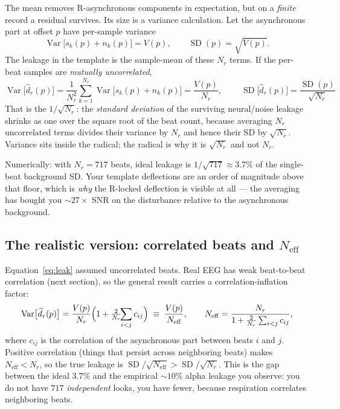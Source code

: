 \documentclass[11pt]{article}
\newcommand{\Var}{\operatorname{Var}}
\newcommand{\SD}{\operatorname{SD}}
\newcommand{\dhat}{\widehat{d}}
\begin{document}
The mean removes R-asynchronous components in expectation, but on a \emph{finite} record a residual
survives. Its size is a variance calculation. Let the asynchronous part at offset $p$ have
per-sample variance
\begin{equation}
\Var\bigl[s_k(p)+n_k(p)\bigr] = V(p), \qquad \SD(p)=\sqrt{V(p)}.
\end{equation}
The leakage in the template is the sample-mean of these $N_r$ terms. If the per-beat samples are
\emph{mutually uncorrelated},
\begin{equation}
\Var\bigl[\dhat_r(p)\bigr]
= \frac{1}{N_r^2}\sum_{k=1}^{N_r}\Var\bigl[s_k(p)+n_k(p)\bigr]
= \frac{V(p)}{N_r},
\qquad
\boxed{\ \SD\bigl[\dhat_r(p)\bigr] = \frac{\SD(p)}{\sqrt{N_r}}\ }
\label{eq:leak}
\end{equation}
That is the $1/\sqrt{N_r}$: the \emph{standard deviation} of the surviving neural/noise leakage
shrinks as one over the square root of the beat count, because averaging $N_r$ uncorrelated terms
divides their variance by $N_r$ and hence their SD by $\sqrt{N_r}$. Variance sits inside the
radical; the radical is why it is $\sqrt{N_r}$ and not $N_r$.

Numerically: with $N_r=717$ beats, ideal leakage is $1/\sqrt{717}\approx 3.7\%$ of the
single-beat background SD. Your template deflections are an order of magnitude above that floor,
which is \emph{why} the R-locked deflection is visible at all --- the averaging has bought you
$\sim\!27\times$ SNR on the disturbance relative to the asynchronous background.

\subsection*{The realistic version: correlated beats and $N_{\mathrm{eff}}$}

Equation~\eqref{eq:leak} assumed uncorrelated beats. Real EEG has weak beat-to-beat correlation
(next section), so the general result carries a correlation-inflation factor:
\begin{equation}
\Var\bigl[\dhat_r(p)\bigr]
= \frac{V(p)}{N_r}\Bigl(1 + \tfrac{2}{N_r}\!\!\sum_{i<j} c_{ij}\Bigr)
\;\equiv\; \frac{V(p)}{N_{\mathrm{eff}}},
\qquad
N_{\mathrm{eff}} = \frac{N_r}{1 + \tfrac{2}{N_r}\sum_{i<j}c_{ij}},
\label{eq:neff}
\end{equation}
where $c_{ij}$ is the correlation of the asynchronous part between beats $i$ and $j$. Positive
correlation (things that persist across neighboring beats) makes $N_{\mathrm{eff}}<N_r$, so the
true leakage is $\SD/\sqrt{N_{\mathrm{eff}}}>\SD/\sqrt{N_r}$. This is the gap between the ideal
$3.7\%$ and the empirical $\sim\!10\%$ alpha leakage you observe: you do not have $717$
\emph{independent} looks, you have fewer, because respiration correlates neighboring beats.
\end{document}
